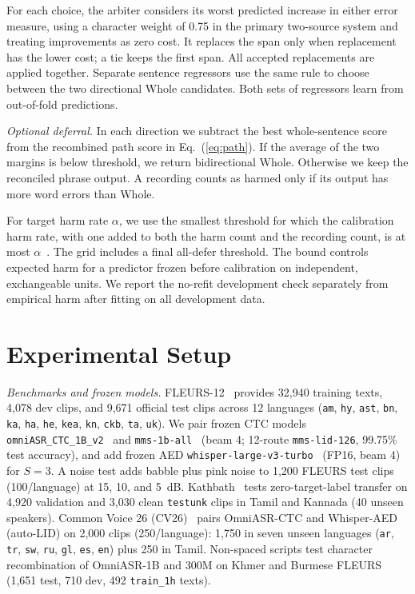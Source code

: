 \documentclass[conference,letterpaper]{IEEEtran}
\begin{document}
For each choice, the arbiter considers its worst predicted increase in either error measure, using a character weight of 0.75 in the primary two-source system and treating improvements as zero cost. It replaces the span only when replacement has the lower cost; a tie keeps the first span. All accepted replacements are applied together. Separate sentence regressors use the same rule to choose between the two directional Whole candidates. Both sets of regressors learn from out-of-fold predictions.

\emph{Optional deferral.} In each direction we subtract the best whole-sentence score from the recombined path score in Eq.~(\ref{eq:path}). If the average of the two margins is below threshold, we return bidirectional Whole. Otherwise we keep the reconciled phrase output. A recording counts as harmed only if its output has more word errors than Whole.

For target harm rate $\alpha$, we use the smallest threshold for which the calibration harm rate, with one added to both the harm count and the recording count, is at most $\alpha$~\cite{angelopoulos2024crc}. The grid includes a final all-defer threshold. The bound controls expected harm for a predictor frozen before calibration on independent, exchangeable units. We report the no-refit development check separately from empirical harm after fitting on all development data.

\section{Experimental Setup}
\emph{Benchmarks and frozen models.} FLEURS-12~\cite{conneau2023fleurs} provides 32,940 training texts, 4,078 dev clips, and 9,671 official test clips across 12 languages (\texttt{am}, \texttt{hy}, \texttt{ast}, \texttt{bn}, \texttt{ka}, \texttt{ha}, \texttt{he}, \texttt{kea}, \texttt{kn}, \texttt{ckb}, \texttt{ta}, \texttt{uk}). We pair frozen CTC models \texttt{omniASR\_CTC\_1B\_v2}~\cite{omni2025} and \texttt{mms-1b-all}~\cite{pratap2024mms} (beam 4; 12-route \texttt{mms-lid-126}, 99.75\% test accuracy), and add frozen AED \texttt{whisper-large-v3-turbo}~\cite{radford2023whisper} (FP16, beam 4) for $S=3$. A noise test adds babble plus pink noise to 1,200 FLEURS test clips (100/language) at 15, 10, and 5~dB. Kathbath~\cite{javed2023indic} tests zero-target-label transfer on 4,920 validation and 3,030 clean \texttt{testunk} clips in Tamil and Kannada (40 unseen speakers). Common Voice 26 (CV26)~\cite{ardila2020commonvoice} pairs OmniASR-CTC and Whisper-AED (auto-LID) on 2,000 clips (250/language): 1,750 in seven unseen languages (\texttt{ar}, \texttt{tr}, \texttt{sw}, \texttt{ru}, \texttt{gl}, \texttt{es}, \texttt{en}) plus 250 in Tamil. Non-spaced scripts test character recombination of OmniASR-1B and 300M on Khmer and Burmese FLEURS (1,651 test, 710 dev, 492 \texttt{train\_1h} texts).
\end{document}
